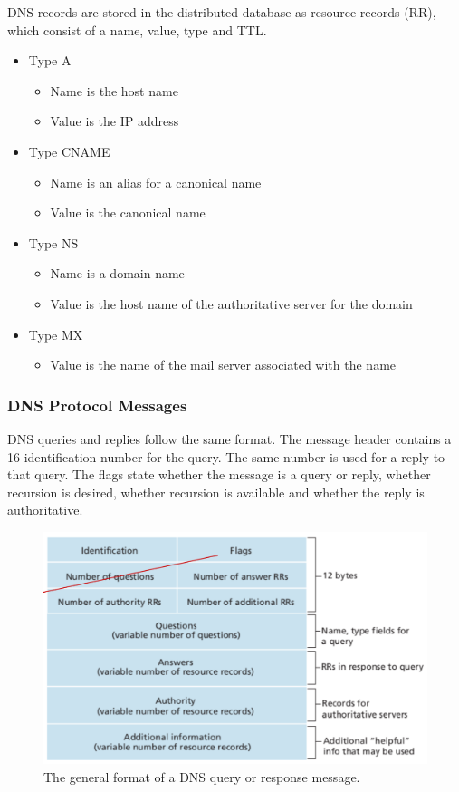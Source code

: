 DNS records are stored in the distributed database as resource records (RR), which consist of a name, value, type and TTL\@.
\begin{itemize}
  \item Type A
  \begin{itemize}
    \item Name is the host name
    \item Value is the IP address
  \end{itemize}
  \item Type CNAME
  \begin{itemize}
    \item Name is an alias for a canonical name
    \item Value is the canonical name
  \end{itemize}
  \item Type NS
  \begin{itemize}
    \item Name is a domain name
    \item Value is the host name of the authoritative server for the domain
  \end{itemize}
  \item Type MX
  \begin{itemize}
    \item Value is the name of the mail server associated with the name
  \end{itemize}
\end{itemize}

\subsubsection{DNS Protocol Messages}

DNS queries and replies follow the same format.
The message header contains a \SI{16}{\bit} identification number for the query.
The same number is used for a reply to that query.
The flags state whether the message is a query or reply, whether recursion is desired, whether recursion is available and whether the reply is authoritative.

\begin{figure}[htp]
  \centering
  \includegraphics[width=12cm]{unit-17/figures/dns-message.png}
  \caption*{The general format of a DNS query or response message.}
\end{figure}

